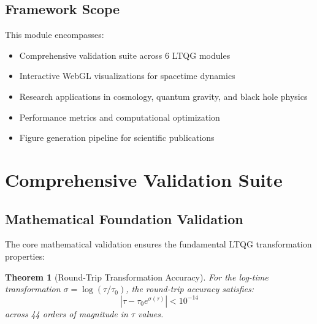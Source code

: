 \documentclass[11pt,a4paper]{article}
\newtheorem{theorem}{Theorem}[section]
\theoremstyle{definition}
\theoremstyle{remark}
\begin{document}
\subsection{Framework Scope}

This module encompasses:
\begin{itemize}
\item Comprehensive validation suite across 6 LTQG modules
\item Interactive WebGL visualizations for spacetime dynamics
\item Research applications in cosmology, quantum gravity, and black hole physics
\item Performance metrics and computational optimization
\item Figure generation pipeline for scientific publications
\end{itemize}

\section{Comprehensive Validation Suite}

\subsection{Mathematical Foundation Validation}

The core mathematical validation ensures the fundamental LTQG transformation properties:

\begin{theorem}[Round-Trip Transformation Accuracy]
For the log-time transformation $\sigma = \log(\tau/\tau_0)$, the round-trip accuracy satisfies:
\begin{equation}
|\tau - \tau_0 e^{\sigma(\tau)}| < 10^{-14}
\end{equation}
across 44 orders of magnitude in $\tau$ values.
\end{theorem}
\end{document}
